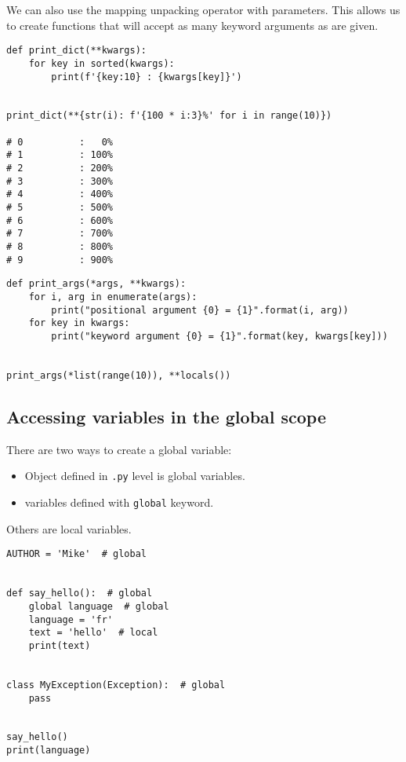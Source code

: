 We can also use the mapping unpacking operator with parameters.
This allows us to create functions that will accept as many keyword arguments as are given.

\begin{lstlisting}
def print_dict(**kwargs):
    for key in sorted(kwargs):
        print(f'{key:10} : {kwargs[key]}')


print_dict(**{str(i): f'{100 * i:3}%' for i in range(10)})  

# 0          :   0%
# 1          : 100%
# 2          : 200%
# 3          : 300%
# 4          : 400%
# 5          : 500%
# 6          : 600%
# 7          : 700%
# 8          : 800%
# 9          : 900%
\end{lstlisting}

\begin{lstlisting}
def print_args(*args, **kwargs):
    for i, arg in enumerate(args):
        print("positional argument {0} = {1}".format(i, arg))
    for key in kwargs:
        print("keyword argument {0} = {1}".format(key, kwargs[key]))


print_args(*list(range(10)), **locals())  
\end{lstlisting}




\subsection{Accessing variables in the global scope}

\begin{tcolorbox}
There are two ways to create a global variable:
\begin{itemize}
\item Object defined in \verb|.py| level is global variables.
\item variables defined with \verb|global| keyword.
\end{itemize}
Others are local variables.
\end{tcolorbox}

\begin{lstlisting}
AUTHOR = 'Mike'  # global


def say_hello():  # global
    global language  # global
    language = 'fr'
    text = 'hello'  # local
    print(text)


class MyException(Exception):  # global
    pass


say_hello()
print(language)  
\end{lstlisting}


